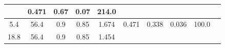 \documentclass[a4paper,12pt]{article}
\begin{document}
\begin{longtable}{
     |
%    
    c|
%    
    c|
%    
    c|
%    
    c|
%    
    c|
%    
    c|
%    
    c|
%    
    c|
%    
    c|
%    
    c|
%    
    }
%        
        & 0.471
%        

%        

%        
        & 0.67
%        

%        

%        
        & 0.07
%        

%        

%        
        & 214.0
%        

%        
        \\
        \hline

        

%        

%        
        5.4
%        

%        

%        
        & 56.4
%        

%        

%        
        & 0.9
%        

%        

%        
        & 0.85
%        

%        

%        
        & 1.674
%        

%        

%        
        & 0.471
%        

%        

%        
        & 0.338
%        

%        

%        
        & 0.036
%        

%        

%        
        & 100.0
%        

%        
        \\
        \hline

        

%        

%        
        18.8
%        

%        

%        
        & 56.4
%        

%        

%        
        & 0.9
%        

%        

%        
        & 0.85
%        

%        

%        
        & 1.454
%        

%        


\end{longtable}
\end{document}
